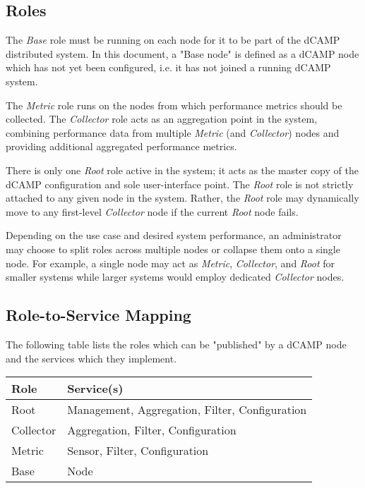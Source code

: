 \subsection{Roles}

The \textit{Base} role must be running on each node for it to be part of the dCAMP distributed system. In this document,
a "Base node" is defined as a dCAMP node which has not yet been configured, i.e. it has not joined a running dCAMP
system.

The \textit{Metric} role runs on the nodes from which performance metrics should be collected. The \textit{Collector}
role acts as an aggregation point in the system, combining performance data from multiple \textit{Metric} (and
\textit{Collector}) nodes and providing additional aggregated performance metrics.

There is only one \textit{Root} role active in the system; it acts as the master copy of the dCAMP configuration and
sole user-interface point. The \textit{Root} role is not strictly attached to any given node in the system. Rather, the
\textit{Root} role may dynamically move to any first-level \textit{Collector} node if the current \textit{Root} node
fails.

Depending on the use case and desired system performance, an administrator may choose to split roles across multiple
nodes or collapse them onto a single node. For example, a single node may act as \textit{Metric}, \textit{Collector},
and \textit{Root} for smaller systems while larger systems would employ dedicated \textit{Collector} nodes.

\subsection{Role-to-Service Mapping}

The following table lists the roles which can be "published" by a dCAMP node and the services which they implement.

\begin{tabular}{|l|l|}

\hline
\textbf{Role} & \textbf{Service(s)} \\
\hline
Root & Management, Aggregation, Filter, Configuration \\
\hline
Collector & Aggregation, Filter, Configuration \\
\hline
Metric & Sensor, Filter, Configuration \\
\hline
Base & Node \\
\hline

\end{tabular}

